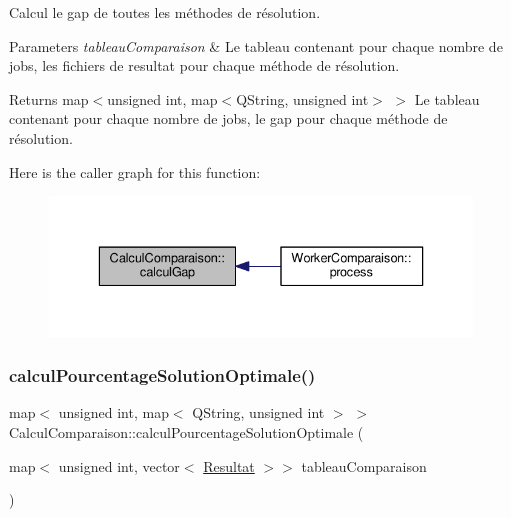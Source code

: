 Calcul le gap de toutes les méthodes de résolution. 


\begin{DoxyParams}{Parameters}
{\em tableau\+Comparaison} & Le tableau contenant pour chaque nombre de jobs, les fichiers de resultat pour chaque méthode de résolution. \\
\hline
\end{DoxyParams}
\begin{DoxyReturn}{Returns}
map$<$unsigned int, map$<$\+Q\+String, unsigned int$>$ $>$ Le tableau contenant pour chaque nombre de jobs, le gap pour chaque méthode de résolution. 
\end{DoxyReturn}
Here is the caller graph for this function\+:\nopagebreak
\begin{figure}[H]
\begin{center}
\leavevmode
\includegraphics[width=336pt]{classCalculComparaison_ada2ba7f37482b4261450e38a8aeed123_icgraph}
\end{center}
\end{figure}
\mbox{\label{classCalculComparaison_a2e68afe2dcc785f580d7e0a365c2b607}} 
\subsubsection{\texorpdfstring{calcul\+Pourcentage\+Solution\+Optimale()}{calculPourcentageSolutionOptimale()}}
{\footnotesize\ttfamily map$<$ unsigned int, map$<$ Q\+String, unsigned int $>$ $>$ Calcul\+Comparaison\+::calcul\+Pourcentage\+Solution\+Optimale (\begin{DoxyParamCaption}\item[{map$<$ unsigned int, vector$<$ \hyperlink{classResultat}{Resultat} $>$$>$}]{tableau\+Comparaison }\end{DoxyParamCaption})}



